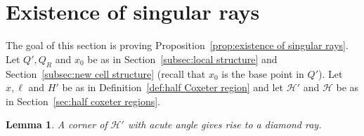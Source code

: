 \documentclass[11pt]{amsart}
\newcommand {\h}{\mathcal H}
\newtheorem{lemma}[theorem]{Lemma}
\theoremstyle{definition}
\begin{document}
\section{Existence of singular rays}
\label{sec:proof Existence of singular rays}

The goal of this section is proving Proposition~\ref{prop:existence of singular rays}. Let $Q',Q_R$ and $x_0$ be as in Section~\ref{subsec:local structure} and Section~\ref{subsec:new cell structure} (recall that $x_0$ is the base point in $Q'$). Let $x,\ell$ and $H'$ be as in Definition~\ref{def:half Coxeter region} and let $\h'$ and $\h$ be as in Section~\ref{sec:half coxeter regions}.

\begin{lemma}
	\label{lem:diamond}
A corner of $\h'$ with acute angle gives rise to a diamond ray.
\end{lemma}
\end{document}
